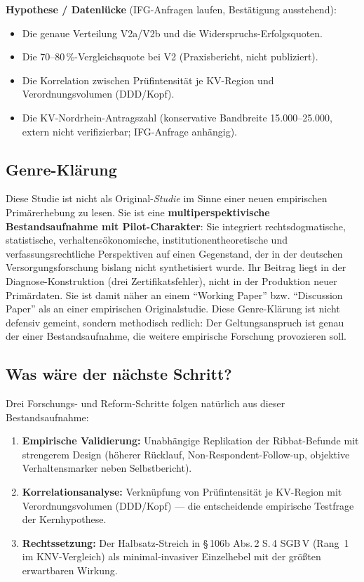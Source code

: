 \documentclass{umbruch-position}
\begin{document}
\textbf{Hypothese / Datenlücke} (IFG-Anfragen laufen, Bestätigung ausstehend):

\begin{itemize}[nosep]
  \item Die genaue Verteilung V2a/V2b und die Widerspruchs-Erfolgsquoten.
  \item Die 70--80\,\%-Vergleichsquote bei V2 (Praxis\-bericht, nicht publiziert).
  \item Die Korrelation zwischen Prüfintensität je KV-Region und Verordnungs\-volumen (DDD/Kopf).
  \item Die KV-Nordrhein-Antragszahl (konservative Bandbreite 15.000--25.000, extern nicht verifizierbar; IFG-Anfrage anhängig).
\end{itemize}

\subsection{Genre-Klärung}

Diese Studie ist nicht als Original-\textit{Studie} im Sinne einer neuen empirischen Primär\-erhebung zu lesen. Sie ist eine \textbf{multiperspektivische Bestandsaufnahme mit Pilot-Charakter}: Sie integriert rechtsdogmatische, statistische, verhaltensökonomische, institutionen\-theoretische und verfassungs\-rechtliche Perspektiven auf einen Gegenstand, der in der deutschen Versorgungs\-forschung bislang nicht synthetisiert wurde. Ihr Beitrag liegt in der Diagnose-Konstruktion (drei Zertifikatsfehler), nicht in der Produktion neuer Primär\-daten. Sie ist damit näher an einem ``Working Paper'' bzw. ``Discussion Paper'' als an einer empirischen Originalstudie. Diese Genre-Klärung ist nicht defensiv gemeint, sondern methodisch redlich: Der Geltungsanspruch ist genau der einer Bestands\-aufnahme, die weitere empirische Forschung provozieren soll.

\subsection{Was wäre der nächste Schritt?}

Drei Forschungs- und Reform-Schritte folgen natürlich aus dieser Bestandsaufnahme:

\begin{enumerate}[nosep]
  \item \textbf{Empirische Validierung:} Unabhängige Replikation der Ribbat-Befunde mit strengerem Design (höherer Rücklauf, Non-Respondent-Follow-up, objektive Verhaltens\-marker neben Selbstbericht).
  \item \textbf{Korrelationsanalyse:} Verknüpfung von Prüf\-intensität je KV-Region mit Verordnungs\-volumen (DDD/Kopf) --- die entscheidende empirische Testfrage der Kernhypothese.
  \item \textbf{Rechts\-setzung:} Der Halbsatz-Streich in \S\,106b Abs.\,2 S.\,4 SGB\,V (Rang~1 im KNV-Vergleich) als minimal-invasiver Einzelhebel mit der größten erwartbaren Wirkung.
\end{enumerate}
\end{document}
